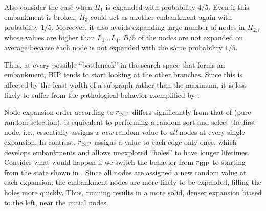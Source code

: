 Also consider the case when $H_1$ is expanded with probability $4/5$.
Even if this embankment is broken, $H_3$ could act as another embankment again with probability $1/5$.
Moreover, it also avoids expanding large number of nodes in $H_{2,i}$ whose values are higher than $L_1\ldots L_4$.
$B/5$ of the nodes are not expanded on average because each node is not expanded with the same probability $1/5$.

Thus, at every possible ``bottleneck'' in the search space that forms an embankment, BIP tends to start looking at the other branches.
Since this is affected by the least width of a subgraph rather than the maximum,
it is less likely to suffer from the pathological behavior exemplified by .


Node expansion order according to $r_\text{BIP}$ differs  significantly from that of \ro (pure random selection).
% 
\ro is equivalent to performing a random sort and select the first node, i.e., \ro essentially assigns a \emph{new} random value to \emph{all} nodes at every single expansion.
In contrast, $r_\text{BIP}$ assigns a value to each edge only once, which develops embankments and allows unexplored ``holes'' to have longer lifetimes.
% 
% 
Consider what would happen if we switch the behavior from $r_\text{BIP}$ to \ro starting from the state shown in . Since all nodes are assigned a new random value at each expansion, the embankment nodes are more likely to be expanded, filling the holes more quickly. Thus, running \ro results in a more solid, denser expansion biased to the left, near the initial nodes.





